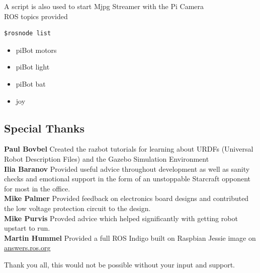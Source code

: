 \documentclass[12pt,titlepage,oneside]{memoir}
\begin{document}
A script is also used to start Mjpg Streamer with the Pi Camera\\

ROS topics provided
\begin{verbatim}
$rosnode list
\end{verbatim}

\begin{itemize}
\item piBot motors
\item piBot light
\item piBot bat
\item joy
\end{itemize}

\begin{appendices}
\chapter{Special Thanks}
\textbf{Paul Bovbel} Created the razbot tutorials for learning about URDFs (Universal Robot Description Files) and the Gazebo Simulation Environment\\
\textbf{Ilia Baranov} Provided useful advice throughout development as well as sanity checks and emotional support in the form of an unstoppable Starcraft opponent for most in the office. \\
\textbf{Mike Palmer} Provided feedback on electronics board designs and contributed the low voltage protection circuit to the design.\\
\textbf{Mike Purvis} Provded advice which helped significantly with getting robot upstart to run.\\
\textbf{Martin Hummel} Provided a full ROS Indigo built on Raspbian Jessie image on \href{http://answers.ros.org/question/200504/raspbian-jessie-ros-indigo-download-image/?comment=203168#comment-203168}{answers.ros.org}

Thank you all, this would not be possible without your input and support.

\end{appendices}
\end{document}
